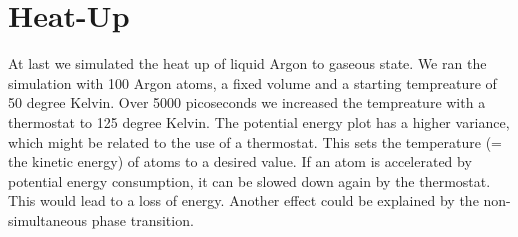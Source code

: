 \documentclass[10pt, a4paper, oneside, twocolumn]{report}
\begin{document}
\section{Heat-Up}

At last we simulated the heat up of liquid Argon to gaseous state. We ran the simulation with 100 Argon atoms, a fixed volume and a starting tempreature of 50 degree Kelvin. Over 5000 picoseconds we increased the tempreature with a thermostat to 125 degree Kelvin.
The potential energy plot has a higher variance, which might be related to the use of a thermostat. This sets the temperature (= the kinetic energy) of atoms to a desired value. If an atom is accelerated by potential energy consumption, it can be slowed down again by the thermostat. This would lead to a loss of energy. Another effect could be explained by the non-simultaneous phase transition.
\end{document}
